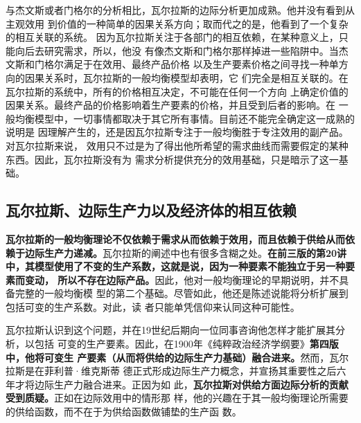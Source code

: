 与杰文斯或者门格尔的分析相比，瓦尔拉斯的边际分析更加成熟。他并没有看到从主观效用
到价值的一种简单的因果关系方向；取而代之的是，他看到了一个复杂的相互关联的系统。
因为瓦尔拉斯关注于各部门的相互依赖，在某种意义上，只能向后去研究需求，所以，他没
有像杰文斯和门格尔那样掉进一些陷阱中。当杰文斯和门格尔满足于在效用、最终产品价格
以及生产要素价格之间寻找一种单方向的因果关系时，瓦尔拉斯的一般均衡模型却表明，它
们完全是相互关联的。在瓦尔拉斯的系统中，所有的价格相互决定，不可能在任何一个方向
上确定价值的因果关系。最终产品的价格影响着生产要素的价格，并且受到后者的影响。在
一般均衡模型中，一切事情都取决于其它所有事情。目前还不能完全确定这一成熟的说明是
因理解产生的，还是因瓦尔拉斯专注于一般均衡胜于专注效用的副产品。对瓦尔拉斯来说，
效用只不过是为了得出他所希望的需求曲线而需要假定的某种东西。因此，瓦尔拉斯没有为
需求分析提供充分的效用基础，只是暗示了这一基础。

\subsection{瓦尔拉斯、边际生产力以及经济体的相互依赖}

\textbf{瓦尔拉斯的一般均衡理论不仅依赖于需求从而依赖于效用，而且依赖于供给从而依
赖于边际生产力递减。}瓦尔拉斯的阐述中也有很多含糊之处。\textbf{在前三版的第20讲
中，其模型使用了不变的生产系数，这就是说，因为一种要素不能独立于另一种要素而变动，
所以不存在边际产品。}因此，他对一般均衡理论的早期说明，并不具备完整的一般均衡模
型的第二个基础。尽管如此，他还是陈述说能将分析扩展到包括可变的生产系数。对此，读
者只能单凭信仰来认同这种可能性。

瓦尔拉斯认识到这个问题，并在19世纪后期向一位同事咨询他怎样才能扩展其分析，以包括
可变的生产要素。因此，在1900年《纯粹政治经济学纲要》\textbf{第四版中，他将可变生
产要素（从而将供给的边际生产力基础）融合进来。}然而，瓦尔拉斯是在菲利普·维克斯蒂
德正式形成边际生产力概念，并宣扬其重要性之后六年才将边际生产力融合进来。正因为如
此，\textbf{瓦尔拉斯对供给方面边际分析的贡献受到质疑。}正如在边际效用中的情形那
样，他的兴趣在于其一般均衡理论所需要的供给函数，而不在于为供给函数做铺垫的生产函
数。

